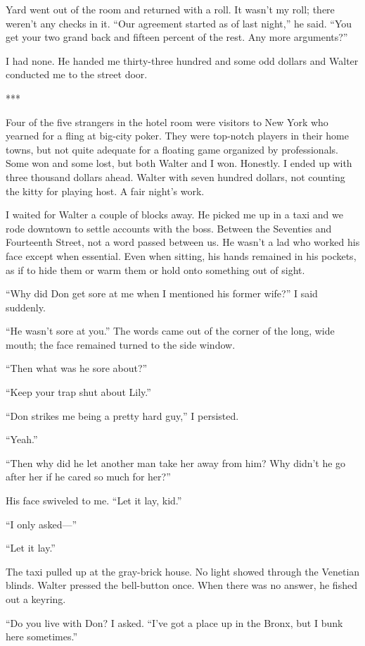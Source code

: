 \documentclass{novel}
\begin{document}
{Yard went out of the room and returned with a roll. It wasn’t my roll; there weren’t any checks in it. “Our agreement started as of last night,” he said. “You get your two grand back and fifteen percent of the rest. Any more arguments?”

I had none. He handed me thirty-three hundred and some odd dollars and Walter conducted me to the street door.

***

Four of the five strangers in the hotel room were visitors to New York who yearned for a fling at big-city poker. They were top-notch players in their home towns, but not quite adequate for a floating game organized by professionals. Some won and some lost, but both Walter and I won. Honestly. I ended up with three thousand dollars ahead. Walter with seven hundred dollars, not counting the kitty for playing host. A fair night’s work.

I waited for Walter a couple of blocks away. He picked me up in a taxi and we rode downtown to settle accounts with the boss. Between the Seventies and Fourteenth Street, not a word passed between us. He wasn’t a lad who worked his face except when essential. Even when sitting, his hands remained in his pockets, as if to hide them or warm them or hold onto something out of sight.

“Why did Don get sore at me when I mentioned his former wife?” I said suddenly.

“He wasn’t sore at you.” The words came out of the corner of the long, wide mouth; the face remained turned to the side window.

“Then what was he sore about?”

“Keep your trap shut about Lily.”

“Don strikes me being a pretty hard guy,” I persisted.

“Yeah.”

“Then why did he let another man take her away from him? Why didn’t he go after her if he cared so much for her?”

His face swiveled to me. “Let it lay, kid.”

“I only asked—”

“Let it lay.”

The taxi pulled up at the gray-brick house. No light showed through the Venetian blinds. Walter pressed the bell-button once. When there was no answer, he fished out a keyring.

“Do you live with Don? I asked. “I’ve got a place up in the Bronx, but I bunk here sometimes.”

}
\end{document}
